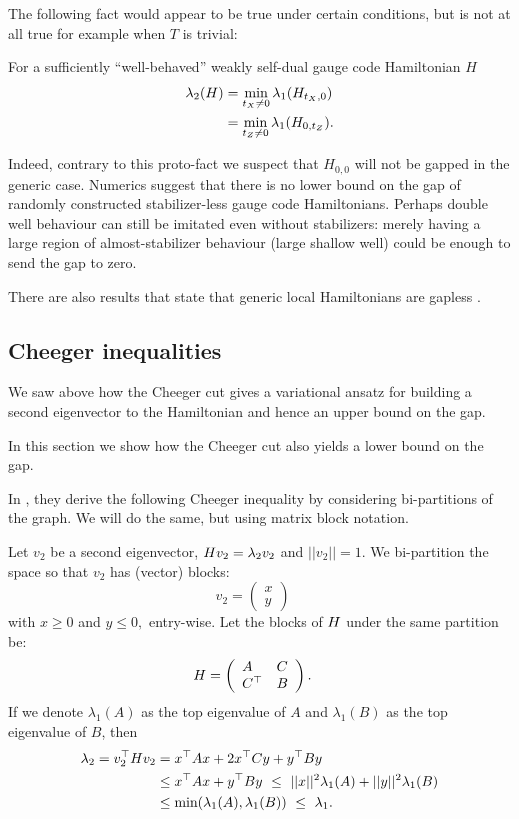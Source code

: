 The following fact would appear to be true under certain conditions,
but is not at all true for example when $T$ is trivial:
\begin{framed}
For a sufficiently ``well-behaved''
weakly self-dual
gauge code Hamiltonian $H$
\begin{align*}
\lambda_2(H) 
    &= \min_{t_X\ne 0} \lambda_1(H_{t_X,0})\\
    &= \min_{t_Z\ne 0} \lambda_1(H_{0,t_Z}).
\end{align*}
\end{framed}
Indeed, contrary to this proto-fact
we suspect that $H_{0,0}$ will not be gapped in
the generic case. 
Numerics suggest that
there is no lower bound on the gap of 
randomly constructed stabilizer-less gauge code Hamiltonians.
Perhaps double well behaviour can still be imitated even without
stabilizers: merely having a large region of almost-stabilizer
behaviour (large shallow well) could be enough to send the gap to zero.

There are also results that state that generic 
local Hamiltonians are gapless \cite{Movassagh2016}.

\subsection{Cheeger inequalities}

We saw above how the Cheeger cut gives a variational ansatz
for building a second eigenvector to the Hamiltonian and hence
an upper bound on the gap.

In this section we show how the Cheeger cut also 
yields a lower bound on the gap.

In \cite{Friedland2002}, they derive the following Cheeger inequality
by considering bi-partitions of the graph. We will do the
same, but using matrix block notation.

Let $v_2$ be a second eigenvector, $ H v_2 = \lambda_2 v_2 $ 
and $||v_2||=1$.
We bi-partition the space 
so that $v_2$ has (vector) blocks:
$$
v_2 = \left( \begin{array}{l}
x\\
y\end{array} \right)\quad
$$
with $x\ge 0$ and $y\le 0,$ entry-wise.
Let the blocks of $H$ under the same partition be:
$$
H = \left( \begin{array}{ll}
A&C\\
C^\top&B\end{array} \right).\quad
$$
If we denote $\lambda_1(A)$ as the top eigenvalue of $A$ and
$\lambda_1(B)$ as the top eigenvalue of $B$,
then
\begin{align*}
\lambda_2 = v_2^\top H v_2 &= x^\top A x + 2 x^\top C y + y^\top B y \\
        &\le x^\top A x + y^\top B y\ \le\ ||x||^2 \lambda_1(A) + ||y||^2 \lambda_1(B) \\
        &\le \mbox{min}(\lambda_1(A), \lambda_1(B))\ \le\ \lambda_1.
\end{align*}

